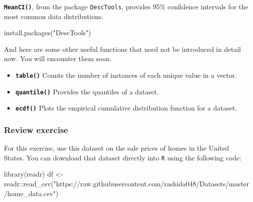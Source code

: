 \documentclass[
]{book}
\newenvironment{Shaded}{\begin{snugshade}}{\end{snugshade}}
\newcommand{\FloatTok}[1]{\textcolor[rgb]{0.00,0.00,0.81}{#1}}
\newcommand{\FunctionTok}[1]{\textcolor[rgb]{0.00,0.00,0.00}{#1}}
\newcommand{\NormalTok}[1]{#1}
\newcommand{\OtherTok}[1]{\textcolor[rgb]{0.56,0.35,0.01}{#1}}
\newcommand{\SpecialCharTok}[1]{\textcolor[rgb]{0.00,0.00,0.00}{#1}}
\newcommand{\StringTok}[1]{\textcolor[rgb]{0.31,0.60,0.02}{#1}}
\providecommand{\tightlist}{%
  \setlength{\itemsep}{0pt}\setlength{\parskip}{0pt}}
\begin{document}
\textbf{\texttt{MeanCI()}}, from the package \texttt{DescTools}, provides 95\% confidence intervals for the most common data distributions.

\begin{Shaded}
\begin{Highlighting}[]
\FunctionTok{install.packages}\NormalTok{(}\StringTok{"DescTools"}\NormalTok{)}
\end{Highlighting}
\end{Shaded}

\begin{Shaded}
\end{Shaded}

And here are some other useful functions that need not be introduced in detail now. You will encounter them soon.

\begin{itemize}
\tightlist
\item
  \textbf{\texttt{table()}} Counts the number of instances of each unique value in a vector.
\item
  \textbf{\texttt{quantile()}} Provides the quantiles of a dataset.
\item
  \textbf{\texttt{ecdf()}} Plots the empirical cumulative distribution function for a dataset.
\end{itemize}

\hypertarget{review-exercise-2}{%
\subsubsection*{Review exercise}\label{review-exercise-2}}

For this exercise, use this dataset on the sale prices of homes in the United States. You can download that dataset directly into \texttt{R} using the following code:

\begin{Shaded}
\begin{Highlighting}[]
\FunctionTok{library}\NormalTok{(readr)}
\NormalTok{df }\OtherTok{\textless{}{-}}\NormalTok{ readr}\SpecialCharTok{::}\FunctionTok{read\_csv}\NormalTok{(}\StringTok{"https://raw.githubusercontent.com/rashida048/Datasets/master/home\_data.csv"}\NormalTok{)}
\end{Highlighting}
\end{Shaded}
\end{document}

